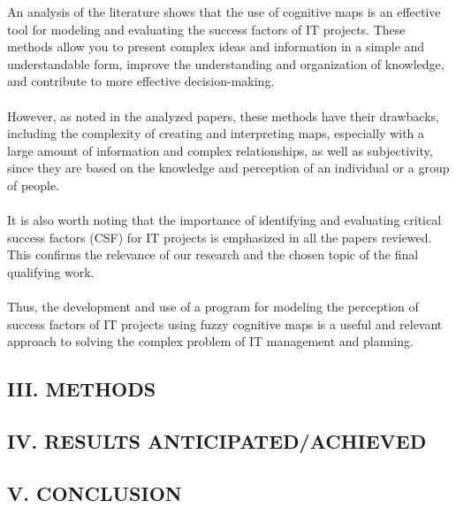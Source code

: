 \documentclass{article}
\begin{document}
    \begin{minipage}{0.49\textwidth}
        An analysis of the literature shows that the use of cognitive maps is an effective tool for modeling and evaluating the success factors of IT projects. These methods allow you to present complex ideas and information in a simple and understandable form, improve the understanding and organization of knowledge, and contribute to more effective decision-making.\\
        ~\\
        However, as noted in the analyzed papers, these methods have their drawbacks, including the complexity of creating and interpreting maps, especially with a large amount of information and complex relationships, as well as subjectivity, since they are based on the knowledge and perception of an individual or a group of people.\\
        ~\\
        It is also worth noting that the importance of identifying and evaluating critical success factors (CSF) for IT projects is emphasized in all the papers reviewed. This confirms the relevance of our research and the chosen topic of the final qualifying work.\\
        ~\\
        Thus, the development and use of a program for modeling the perception of success factors of IT projects using fuzzy cognitive maps is a useful and relevant approach to solving the complex problem of IT management and planning.\\
        \begin{center}
            \chapter{III. METHODS}
        \end{center}
    \end{minipage}
    \hfill
    \begin{minipage}{0.49\textwidth}
        \begin{center}
            \chapter{IV. RESULTS ANTICIPATED/ACHIEVED}
        \end{center}
    \end{minipage}
\newpage
    \begin{minipage}{0.49\textwidth}
        \begin{center}
            \chapter{V. CONCLUSION}
        \end{center}
    \end{minipage}
\end{document}
